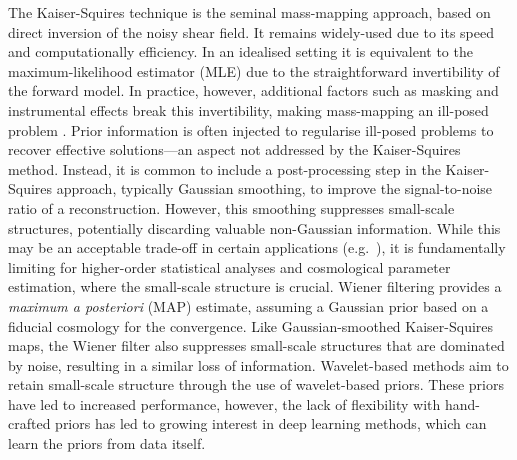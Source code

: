 \documentclass[fleqn,usenatbib]{mnras}
\begin{document}
The Kaiser-Squires technique \citep{kaiser1993mapping} is the seminal mass-mapping approach, based on direct inversion of the noisy shear field. It remains widely-used due to its speed and computationally efficiency. In an idealised setting it is equivalent to the maximum-likelihood estimator (MLE) due to the straightforward invertibility of the forward model. In practice, however, additional factors such as masking and instrumental effects break this invertibility, making mass-mapping an ill-posed problem \citep{price2021sparsecelest}.  Prior information is often injected to regularise ill-posed problems to recover effective solutions---an aspect not addressed by the Kaiser-Squires method. Instead, it is common to include a post-processing step in the Kaiser-Squires approach, typically Gaussian smoothing, to improve the signal-to-noise ratio of a reconstruction. However, this smoothing suppresses small-scale structures, potentially discarding valuable non-Gaussian information. While this may be an acceptable trade-off in certain applications (e.g.\ \citealt{kovacs2022view}), it is fundamentally limiting for higher-order statistical analyses and cosmological parameter estimation, where the small-scale structure is crucial. Wiener filtering \citep{wiener1949extrapolation} provides a \textit{maximum a posteriori} (MAP) estimate, assuming a Gaussian prior based on a fiducial cosmology for the convergence.  Like Gaussian-smoothed Kaiser-Squires maps, the Wiener filter also suppresses small-scale structures that are dominated by noise, resulting in a similar loss of information. Wavelet-based methods \citep{lanusse2016high,price2019sparse,price2020sparse,price2021sparse, price2021sparsehypoth,starck2021weak} aim to retain small-scale structure through the use of wavelet-based priors. These priors have led to increased performance, however, the lack of flexibility with hand-crafted priors has led to growing interest in deep learning methods, which can learn the priors from data itself.
\end{document}
